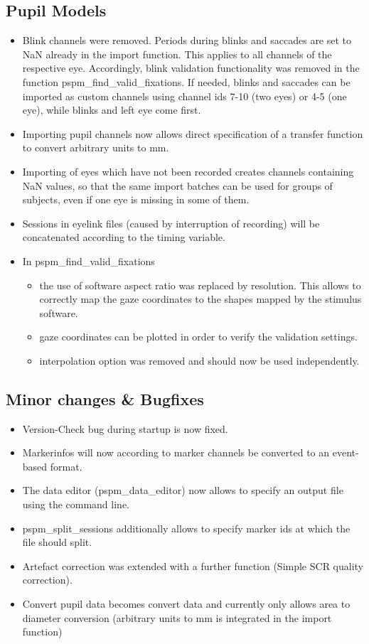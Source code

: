 \documentclass[english]{article}
\numberwithin{equation}{section}
\numberwithin{figure}{section}
\begin{document}
\subsection*{Pupil Models}
\begin{itemize}
\item Blink channels were removed. Periods during blinks and saccades are
set to NaN already in the import function. This applies to all channels
of the respective eye. Accordingly, blink validation functionality
was removed in the function pspm\_find\_valid\_fixations. If needed,
blinks and saccades can be imported as custom channels using channel
ids 7-10 (two eyes) or 4-5 (one eye), while blinks and left eye come
first.
\item Importing pupil channels now allows direct specification of a transfer
function to convert arbitrary units to mm. 
\item Importing of eyes which have not been recorded creates channels containing
NaN values, so that the same import batches can be used for groups
of subjects, even if one eye is missing in some of them.
\item Sessions in eyelink files (caused by interruption of recording) will
be concatenated according to the timing variable.
\item In pspm\_find\_valid\_fixations 
\begin{itemize}
\item the use of software aspect ratio was replaced by resolution. This
allows to correctly map the gaze coordinates to the shapes mapped
by the stimulus software.
\item gaze coordinates can be plotted in order to verify the validation
settings.
\item interpolation option was removed and should now be used independently.
\end{itemize}
\end{itemize}

\subsection*{Minor changes \& Bugfixes}
\begin{itemize}
\item Version-Check bug during startup is now fixed.
\item Markerinfos will now according to marker channels be converted to
an event-based format.
\item The data editor (pspm\_data\_editor) now allows to specify an output
file using the command line.
\item pspm\_split\_sessions additionally allows to specify marker ids at
which the file should split.
\item Artefact correction was extended with a further function (Simple SCR
quality correction).
\item Convert pupil data becomes convert data and currently only allows
area to diameter conversion (arbitrary units to mm is integrated in
the import function)
\end{itemize}
\end{document}

